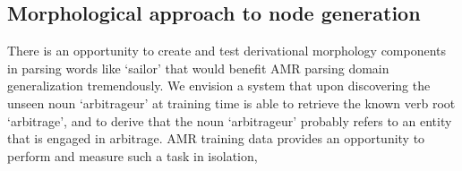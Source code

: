 \documentclass[11pt]{article}
\begin{document}
\subsection{Morphological approach to node generation}
There is an opportunity to create and test derivational morphology components in parsing words like `sailor' that would benefit AMR parsing domain generalization tremendously. We envision a system that upon discovering the unseen noun `arbitrageur' at training time is able to retrieve the known verb root `arbitrage', and to derive that the noun `arbitrageur' probably refers to an entity that is engaged in arbitrage. AMR training data provides an opportunity to perform and measure such a task in isolation, 






\end{document}
